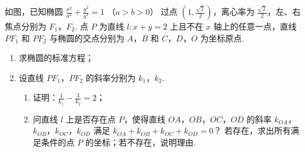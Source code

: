 \begin{problem}
如图，已知椭圆 \(\frac{x^2}{a^2} + \frac{y^2}{b^2} = 1\) （\(a > b > 0\)） 过点 \(\left(1, \frac{\sqrt{2}}{2}\right)\)，离心率为 \(\frac{\sqrt{2}}{2}\)，左、右焦点分别为 \(F_1\)，\(F_2\). 点 \(P\) 为直线 \(l: x + y = 2\) 上且不在 \(x\) 轴上的任意一点，直线 \(PF_1\) 和 \(PF_2\) 与椭圆的交点分别为 \(A\)，\(B\) 和 \(C\)，\(D\)，\(O\) 为坐标原点.

\begin{enumerate}
\item 求椭圆的标准方程；
\item 设直线 \(PF_1\)，\(PF_2\) 的斜率分别为 \(k_1\)，\(k_2\).

\begin{enumerate}
\item 证明：\(\frac{1}{k_1} - \frac{3}{k_2} = 2\)；
\item 问直线 \(l\) 上是否存在点 \(P\)，使得直线 \(OA\)，\(OB\)，\(OC\)，\(OD\) 的斜率 \(k_{OA}\)，\(k_{OB}\)，\(k_{OC}\)，\(k_{OD}\) 满足 \(k_{OA} + k_{OB} + k_{OC} + k_{OD} = 0\)？ 若存在，求出所有满足条件的点 \(P\) 的坐标；若不存在，说明理由.
\end{enumerate}
\end{enumerate}

\end{problem}

